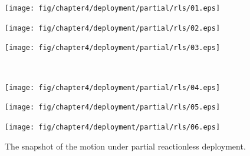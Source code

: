 %
\begin{figure}[t]
  \centering
  \begin{minipage}[h]{0.32\linewidth}
    \texttt{[image: fig/chapter4/deployment/partial/rls/01.eps]}
      \centering
  \end{minipage}
  \begin{minipage}[h]{0.32\linewidth}
    \texttt{[image: fig/chapter4/deployment/partial/rls/02.eps]}
    \centering
  \end{minipage}
  \begin{minipage}[h]{0.32\linewidth}
    \texttt{[image: fig/chapter4/deployment/partial/rls/03.eps]}
    \centering
  \end{minipage}\\
  \vspace{1em}
  \begin{minipage}[h]{0.32\linewidth}
    \texttt{[image: fig/chapter4/deployment/partial/rls/04.eps]}
    \centering
  \end{minipage}
  \begin{minipage}[h]{0.32\linewidth}
    \texttt{[image: fig/chapter4/deployment/partial/rls/05.eps]}
    \centering
  \end{minipage}
  \begin{minipage}[h]{0.32\linewidth}
      \texttt{[image: fig/chapter4/deployment/partial/rls/06.eps]}
      \centering
    \end{minipage}
  \caption{The snapshot of the motion under partial reactionless deployment.}
  \label{fig:SNAP_DEPLOY_PART}
\end{figure}
%
%
